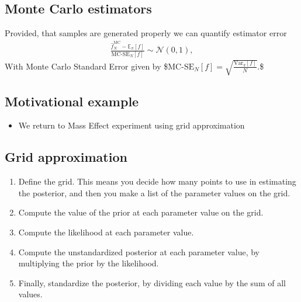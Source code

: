 \documentclass[letterpaper,10pt,english]{jupyterBook}
\begin{document}
\subsection{Monte Carlo estimators}
\label{\detokenize{Lecture 3:monte-carlo-estimators}}
\sphinxAtStartPar
Provided, that samples are generated properly we can quantify estimator error
\begin{equation*}
\begin{split}
\frac{ \hat{f}_{N}^{\text{MC}} - \mathbb{E}_{\pi}[f] }
{\text{MC-SE}_{N}[f] } 
\sim \mathcal{N}(0, 1),
\end{split}
\end{equation*}
\sphinxAtStartPar
With Monte Carlo Standard Error given by
\$\(
\text{MC-SE}_{N}[f] 
= \sqrt{ \frac{ \text{Var}_{\pi}[f]}{N} }.
\)\$


\subsection{Motivational example}
\label{\detokenize{Lecture 3:motivational-example}}\begin{itemize}
\item {} 
\sphinxAtStartPar
We return to Mass Effect experiment using grid approximation

\end{itemize}






\subsection{Grid approximation}
\label{\detokenize{Lecture 3:grid-approximation}}\begin{enumerate}
%
\item {} 
\sphinxAtStartPar
Define the grid. This means you decide how many points to use in estimating the posterior, and then you make a list of the parameter values on the grid.

\item {} 
\sphinxAtStartPar
Compute the value of the prior at each parameter value on the grid.

\item {} 
\sphinxAtStartPar
Compute the likelihood at each parameter value.

\item {} 
\sphinxAtStartPar
Compute the unstandardized posterior at each parameter value, by multiplying the prior by the likelihood.

\item {} 
\sphinxAtStartPar
Finally, standardize the posterior, by dividing each value by the sum of all values.

\end{enumerate}
\end{document}
